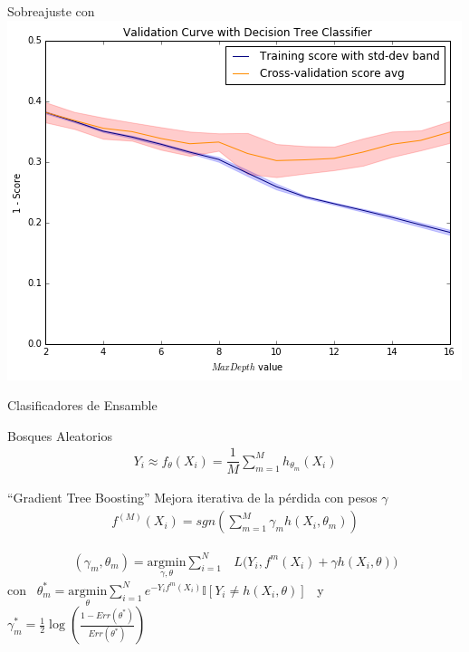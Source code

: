 \documentclass[xcolor=x11names]{beamer}
\begin{document}

\begin{frame}{Sobreajuste con }
\center\
\includegraphics[width=1\textheight]{figure-biasVariance/dtree_overfit_problem_2.png}
\end{frame}


\begingroup
\footnotesize%
\begin{frame}{Clasificadores de Ensamble }

	\begin{block}{Bosques Aleatorios}
		\begin{align*}
			Y_i \approx f_{\theta}(X_i) = \dfrac{1}{M}\sum_{m=1}^M h_{\theta_m}(X_i)
		\end{align*}

	\end{block}

	\begin{block}{``Gradient Tree Boosting''}
		Mejora iterativa de la pérdida con pesos $\gamma$
		\begin{align*}
			f^{(M)}(X_i) = sgn \left(\sum_{m=1}^{M} \gamma_m h(X_i,\theta_m) \right)
		\end{align*}

		\begin{align*}
				(\gamma_{m}, \theta_{m}) = \underset{\gamma, \theta}{\mathrm{argmin}} \sum_{i=1}^{N} & L\big( Y_i,  f^{m}(X_i) + \gamma h(X_i,\theta) \big)
		\end{align*}
		con \  $\theta^*_{m} = \underset{ \theta}{\mathrm{argmin}} \sum_{i=1}^{N}e^{-Y_i f^{m}(X_i)}
		\mathbb{I}\left[ Y_i \neq h(X_i,\theta)  \right]$ \ y \
		$\gamma^*_{m} = \frac{1}{2} \log\left( \frac{1 - Err(\theta^*) }{ Err(\theta^*) } \right)$

	\end{block}


\end{frame}
\endgroup
\end{document}
